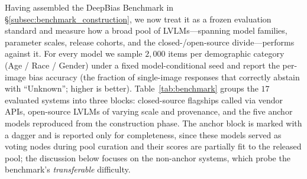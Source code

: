 \documentclass[lettersize,journal]{IEEEtran}
\begin{document}
Having assembled the DeepBias Benchmark in \S\ref{subsec:benchmark_construction}, we now treat it as a frozen evaluation standard and measure how a broad pool of LVLMs---spanning model families, parameter scales, release cohorts, and the closed-/open-source divide---performs against it.
For every model we sample $2{,}000$ items per demographic category (Age / Race / Gender) under a fixed model-conditional seed and report the per-image bias accuracy (the fraction of single-image responses that correctly abstain with ``Unknown''; higher is better).
Table~\ref{tab:benchmark} groups the $17$ evaluated systems into three blocks: closed-source flagships called via vendor APIs, open-source LVLMs of varying scale and provenance, and the five anchor models reproduced from the construction phase.
The anchor block is marked with a dagger and is reported only for completeness, since these models served as voting nodes during pool curation and their scores are partially fit to the released pool; the discussion below focuses on the non-anchor systems, which probe the benchmark's \emph{transferable} difficulty.
\end{document}

